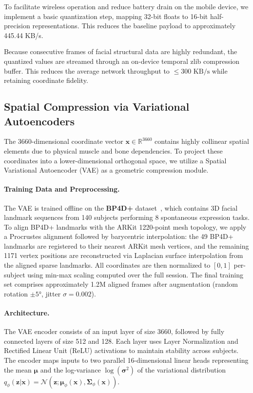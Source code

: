 \documentclass[sigconf]{acmart}
\begin{document}
To facilitate wireless operation and reduce battery drain on the mobile device, we implement a basic quantization step, mapping 32-bit floats to 16-bit half-precision representations. This reduces the baseline payload to approximately 445.44 KB/s. 

Because consecutive frames of facial structural data are highly redundant, the quantized values are streamed through an on-device temporal zlib compression buffer. This reduces the average network throughput to $\le 300 \text{ KB/s}$ while retaining coordinate fidelity.

\subsection{Spatial Compression via Variational Autoencoders}
The 3660-dimensional coordinate vector $\mathbf{x} \in \mathbb{R}^{3660}$ contains highly collinear spatial elements due to physical muscle and bone dependencies. To project these coordinates into a lower-dimensional orthogonal space, we utilize a Spatial Variational Autoencoder (VAE) as a geometric compression module.

\paragraph{Training Data and Preprocessing.}
The VAE is trained offline on the \textbf{BP4D+} dataset~\cite{zhang2017bp4d}, which contains 3D facial landmark sequences from 140 subjects performing 8 spontaneous expression tasks. To align BP4D+ landmarks with the ARKit 1220-point mesh topology, we apply a Procrustes alignment followed by barycentric interpolation: the 49 BP4D+ landmarks are registered to their nearest ARKit mesh vertices, and the remaining 1171 vertex positions are reconstructed via Laplacian surface interpolation from the aligned sparse landmarks. All coordinates are then normalized to $[0, 1]$ per-subject using min-max scaling computed over the full session. The final training set comprises approximately 1.2M aligned frames after augmentation (random rotation $\pm 5°$, jitter $\sigma=0.002$).

\paragraph{Architecture.}
The VAE encoder consists of an input layer of size 3660, followed by fully connected layers of size 512 and 128. Each layer uses Layer Normalization and Rectified Linear Unit (ReLU) activations to maintain stability across subjects. The encoder maps inputs to two parallel 16-dimensional linear heads representing the mean $\boldsymbol{\mu}$ and the log-variance $\log(\boldsymbol{\sigma}^2)$ of the variational distribution $q_\phi(\mathbf{z}|\mathbf{x}) = \mathcal{N}(\mathbf{z}; \boldsymbol{\mu}_\phi(\mathbf{x}), \boldsymbol{\Sigma}_\phi(\mathbf{x}))$.
\end{document}

